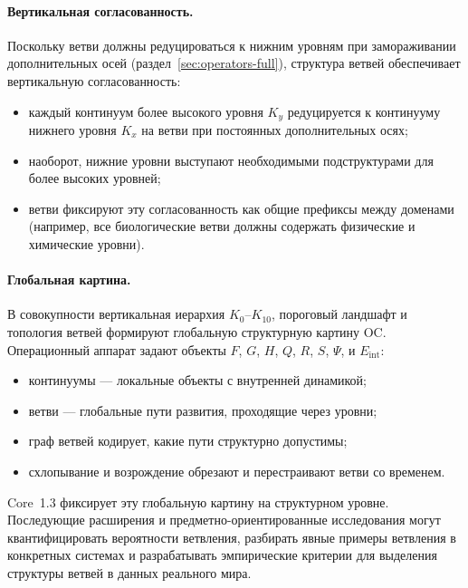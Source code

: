 \paragraph{Вертикальная согласованность.}
Поскольку ветви должны редуцироваться к нижним уровням при замораживании
дополнительных осей (раздел~\ref{sec:operators-full}), структура ветвей
обеспечивает вертикальную согласованность:
\begin{itemize}
  \item каждый континуум более высокого уровня \(K_y\) редуцируется к
        континууму нижнего уровня \(K_x\) на ветви при постоянных
        дополнительных осях;
  \item наоборот, нижние уровни выступают необходимыми подструктурами для
        более высоких уровней;
  \item ветви фиксируют эту согласованность как общие префиксы между
        доменами (например, все биологические ветви должны содержать
        физические и химические уровни).
\end{itemize}

\paragraph{Глобальная картина.}
В совокупности вертикальная иерархия \(K_0\)–\(K_{10}\), пороговый
ландшафт и топология ветвей формируют глобальную структурную картину OC.
Операционный аппарат задают объекты \(F\), \(G\), \(H\), \(Q\), \(R\),
\(S\), \(\Psi\), и \(E_{\mathrm{int}}\):
\begin{itemize}
  \item континуумы — локальные объекты с внутренней динамикой;
  \item ветви — глобальные пути развития, проходящие через уровни;
  \item граф ветвей кодирует, какие пути структурно допустимы;
  \item схлопывание и возрождение обрезают и перестраивают ветви со временем.
\end{itemize}

Core~1.3 фиксирует эту глобальную картину на структурном уровне. Последующие
расширения и предметно-ориентированные исследования могут квантифицировать
вероятности ветвления, разбирать явные примеры ветвления в конкретных
системах и разрабатывать эмпирические критерии для выделения структуры
ветвей в данных реального мира.

